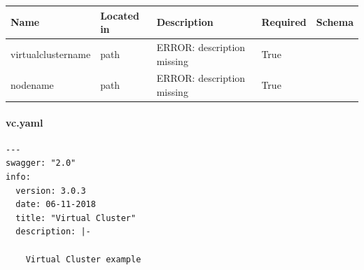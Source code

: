 \documentclass[9pt,]{article}
\let\oldparagraph\paragraph
\renewcommand{\paragraph}[1]{\oldparagraph{#1}\mbox{}}
\begin{document}
\begin{longtable}[]{@{}lllll@{}}
\toprule
Name & Located in & Description & Required & Schema\tabularnewline
\midrule
\endhead
virtualclustername & path & ERROR: description missing & True
&\tabularnewline
nodename & path & ERROR: description missing & True &\tabularnewline
\bottomrule
\end{longtable}

\hypertarget{vc.yaml}{%
\paragraph{vc.yaml}\label{vc.yaml}}

\begin{verbatim}
---
swagger: "2.0"
info:
  version: 3.0.3
  date: 06-11-2018
  title: "Virtual Cluster"
  description: |-

    Virtual Cluster example
    

\end{verbatim}
\end{document}
